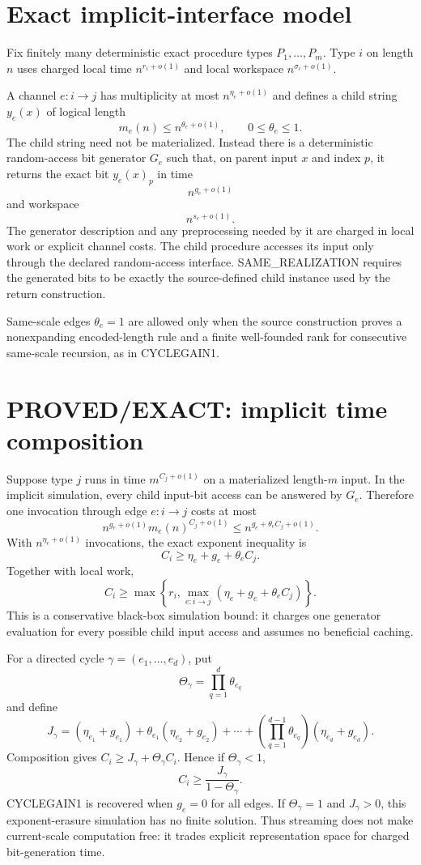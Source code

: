 \documentclass[11pt]{article}
\begin{document}
\section*{Exact implicit-interface model}
Fix finitely many deterministic exact procedure types \(P_1,\ldots,P_m\). Type \(i\) on length \(n\) uses charged local time \(n^{r_i+o(1)}\) and local workspace \(n^{\sigma_i+o(1)}\).

A channel \(e:i\to j\) has multiplicity at most \(n^{\eta_e+o(1)}\) and defines a child string \(y_e(x)\) of logical length
\[
m_e(n)\le n^{\theta_e+o(1)},\qquad 0\le\theta_e\le1.
\]
The child string need not be materialized. Instead there is a deterministic random-access bit generator \(G_e\) such that, on parent input \(x\) and index \(p\), it returns the exact bit \(y_e(x)_p\) in time
\[
n^{g_e+o(1)}
\]
and workspace
\[
n^{s_e+o(1)}.
\]
The generator description and any preprocessing needed by it are charged in local work or explicit channel costs. The child procedure accesses its input only through the declared random-access interface. SAME\_REALIZATION requires the generated bits to be exactly the source-defined child instance used by the return construction.

Same-scale edges \(\theta_e=1\) are allowed only when the source construction proves a nonexpanding encoded-length rule and a finite well-founded rank for consecutive same-scale recursion, as in CYCLEGAIN1.

\section*{PROVED/EXACT: implicit time composition}
Suppose type \(j\) runs in time \(m^{C_j+o(1)}\) on a materialized length-\(m\) input. In the implicit simulation, every child input-bit access can be answered by \(G_e\). Therefore one invocation through edge \(e:i\to j\) costs at most
\[
n^{g_e+o(1)}m_e(n)^{C_j+o(1)}
\le n^{g_e+\theta_e C_j+o(1)}.
\]
With \(n^{\eta_e+o(1)}\) invocations, the exact exponent inequality is
\[
\boxed{C_i\ge \eta_e+g_e+\theta_e C_j.}
\]
Together with local work,
\[
\boxed{
C_i\ge
\max\left\{
r_i,\max_{e:i\to j}(\eta_e+g_e+\theta_e C_j)
\right\}.
}
\]
This is a conservative black-box simulation bound: it charges one generator evaluation for every possible child input access and assumes no beneficial caching.

For a directed cycle \(\gamma=(e_1,\ldots,e_d)\), put
\[
\Theta_\gamma=\prod_{q=1}^d\theta_{e_q}
\]
and define
\[
J_\gamma=
(\eta_{e_1}+g_{e_1})
+\theta_{e_1}(\eta_{e_2}+g_{e_2})
+\cdots+
\left(\prod_{q=1}^{d-1}\theta_{e_q}\right)(\eta_{e_d}+g_{e_d}).
\]
Composition gives \(C_i\ge J_\gamma+\Theta_\gamma C_i\). Hence if \(\Theta_\gamma<1\),
\[
\boxed{C_i\ge\frac{J_\gamma}{1-\Theta_\gamma}.}
\]
CYCLEGAIN1 is recovered when \(g_e=0\) for all edges. If \(\Theta_\gamma=1\) and \(J_\gamma>0\), this exponent-erasure simulation has no finite solution. Thus streaming does not make current-scale computation free: it trades explicit representation space for charged bit-generation time.
\end{document}
